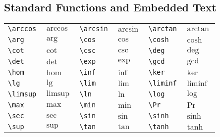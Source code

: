 \subsection{Standard Functions and Embedded Text}
\begin{table}[!htbp]
    \centering
    \begin{tabular}{lp{2cm}lp{2cm}lp{2cm}}
	\verb|\arccos|	& $\arccos$ &
	\verb|\arcsin|	& $\arcsin$ & 
	\verb|\arctan|	& $\arctan$	\\ 
	\verb|\arg|	& $\arg$    & 
	\verb|\cos|	& $\cos$    & 
	\verb|\cosh|	& $\cosh$	\\ 
	\verb|\cot|	& $\cot$    & 
	\verb|\csc|	& $\csc$    & 
	\verb|\deg|	& $\deg$	\\ 
	\verb|\det|	& $\det$    & 
	\verb|\exp|	& $\exp$    & 
	\verb|\gcd|	& $\gcd$	\\ 
	\verb|\hom|	& $\hom$    & 
	\verb|\inf|	& $\inf$    & 
	\verb|\ker|	& $\ker$	\\ 
	\verb|\lg|	& $\lg$	& 
	\verb|\lim|	& $\lim$    & 
	\verb|\liminf|	& $\liminf$	\\ 
	\verb|\limsup|  & $\limsup$ & 
	\verb|\ln|	& $\ln$	&   
	\verb|\log|	& $\log$	\\ 
	\verb|\max|	& $\max$    & 
	\verb|\min|	& $\min$    & 
	\verb|\Pr|	& $\Pr$		\\   
	\verb|\sec|	& $\sec$    & 
	\verb|\sin|	& $\sin$    & 
	\verb|\sinh|	& $\sinh$	\\ 
	\verb|\sup|	& $\sup$    & 
	\verb|\tan|	& $\tan$    & 
	\verb|\tanh|	& $\tanh$	\\
    \end{tabular}
\end{table}

